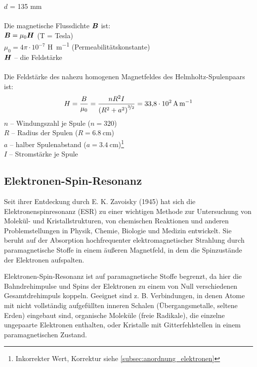 \documentclass[ngerman]{scrartcl}
\begin{document}
\begin{minipage}[t]{0.6\linewidth}
    \vspace{1cm}
    $d$ = 135 mm\\ \\
    Die magnetische Flussdichte $\vb*{B}$ ist:\\
    $\vb*{B} = \mu_0 \vb*{H}$ (T = Tesla)\\
    $\mu_0 = 4 \pi \cdot 10^{-7}$ \si{\henry\per\meter} (Permeabilitätskonstante)\\
    $\vb*{H}$ -- die Feldstärke\\ \\
    Die Feldstärke des nahezu homogenen Magnetfeldes des Helmholtz-Spulenpaars ist:\newline
    \begin{equation}
        {H} = \frac{{B}}{\mu_0} = \frac{n R^2 I}{\left(R^2 + a^2\right)^{\nicefrac{3}{2}}} = \SI{33.8e2}{\ampere\per\meter}
    \end{equation}
    $n$ -- Windungszahl je Spule ($n = 320$)\\
    $R$ -- Radius der Spulen ($R = \SI{6.8}{\centi\meter}$)\\
    $a$ -- halber Spulenabstand ($a = \SI{3.4}{\centi\meter}$)\footnote{Inkorrekter Wert, Korrektur siehe \autoref{subsec:anordnung_elektronen}}\\
    $I$ -- Stromstärke je Spule
\end{minipage}
\setcaphanging


\subsection[Elektronen-Spin-Resonanz]{Elektronen-Spin-Resonanz \cite{ref:angabe_esr}}
\label{subsec:grundlagen_elektronenspinresonanz}
%
Seit ihrer Entdeckung durch E. K. Zavoisky (1945) hat sich die Elektronenspinresonanz (ESR) zu einer wichtigen Methode zur Untersuchung von Molekül- und Kristallstrukturen, von chemischen Reaktionen und anderen Problemstellungen in Physik, Chemie, Biologie und Medizin entwickelt. Sie beruht auf der Absorption hochfrequenter elektromagnetischer Strahlung durch paramagnetische Stoffe in einem äußeren Magnetfeld, in dem die Spinzustände der Elektronen aufspalten.

Elektronen-Spin-Resonanz ist auf paramagnetische Stoffe begrenzt, da hier die Bahndrehimpulse und Spins der Elektronen zu einem von Null verschiedenen Gesamtdrehimpuls koppeln. Geeignet sind z. B. Verbindungen, in denen Atome mit nicht vollständig aufgefüllten inneren Schalen (Übergangsmetalle, seltene Erden) eingebaut sind, organische Moleküle (freie Radikale), die einzelne ungepaarte Elektronen enthalten, oder Kristalle mit Gitterfehlstellen in einem paramagnetischen Zustand.
\end{document}
